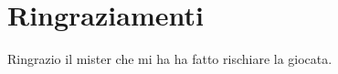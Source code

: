 \thispagestyle{plain}

\section*{Ringraziamenti}
Ringrazio il mister che mi ha ha fatto rischiare la giocata.